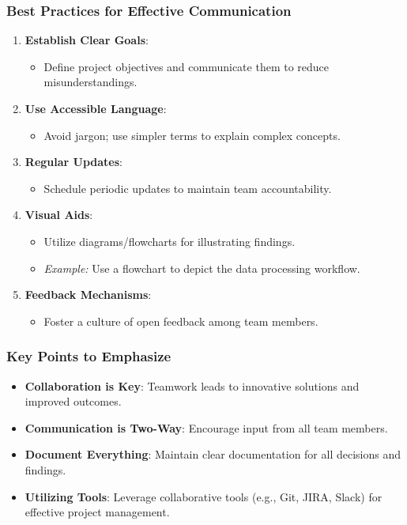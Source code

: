 \documentclass[aspectratio=169]{beamer}
\begin{document}
\begin{frame}[fragile]
    \frametitle{Best Practices for Effective Communication}
    \begin{enumerate}
        \item \textbf{Establish Clear Goals}:
            \begin{itemize}
                \item Define project objectives and communicate them to reduce misunderstandings.
            \end{itemize}
        \item \textbf{Use Accessible Language}:
            \begin{itemize}
                \item Avoid jargon; use simpler terms to explain complex concepts.
            \end{itemize}
        \item \textbf{Regular Updates}:
            \begin{itemize}
                \item Schedule periodic updates to maintain team accountability.
            \end{itemize}
        \item \textbf{Visual Aids}:
            \begin{itemize}
                \item Utilize diagrams/flowcharts for illustrating findings.
                \item \textit{Example:} Use a flowchart to depict the data processing workflow.
            \end{itemize}
        \item \textbf{Feedback Mechanisms}:
            \begin{itemize}
                \item Foster a culture of open feedback among team members.
            \end{itemize}
    \end{enumerate}
\end{frame}

\begin{frame}[fragile]
    \frametitle{Key Points to Emphasize}
    \begin{itemize}
        \item \textbf{Collaboration is Key}: Teamwork leads to innovative solutions and improved outcomes.
        \item \textbf{Communication is Two-Way}: Encourage input from all team members.
        \item \textbf{Document Everything}: Maintain clear documentation for all decisions and findings.
        \item \textbf{Utilizing Tools}: Leverage collaborative tools (e.g., Git, JIRA, Slack) for effective project management.
    \end{itemize}
\end{frame}
\end{document}
